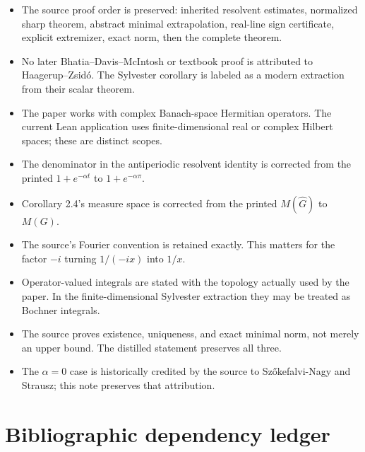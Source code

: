 \begin{itemize}
\item The source proof order is preserved: inherited resolvent estimates, normalized sharp theorem, abstract minimal extrapolation, real-line sign certificate, explicit extremizer, exact norm, then the complete theorem.
\item No later Bhatia--Davis--McIntosh or textbook proof is attributed to Haagerup--Zsid\'o. The Sylvester corollary is labeled as a modern extraction from their scalar theorem.
\item The paper works with complex Banach-space Hermitian operators. The current Lean application uses finite-dimensional real or complex Hilbert spaces; these are distinct scopes.
\item The denominator in the antiperiodic resolvent identity is corrected from the printed $1+e^{-\alpha t}$ to $1+e^{-\alpha\pi}$.
\item Corollary 2.4's measure space is corrected from the printed $M(\widehat G)$ to $M(G)$.
\item The source's Fourier convention is retained exactly. This matters for the factor $-i$ turning $1/(-ix)$ into $1/x$.
\item Operator-valued integrals are stated with the topology actually used by the paper. In the finite-dimensional Sylvester extraction they may be treated as Bochner integrals.
\item The source proves existence, uniqueness, and exact minimal norm, not merely an upper bound. The distilled statement preserves all three.
\item The $\alpha=0$ case is historically credited by the source to Sz\H{o}kefalvi-Nagy and Strausz; this note preserves that attribution.
\end{itemize}

\section{Bibliographic dependency ledger}
\begingroup\small

